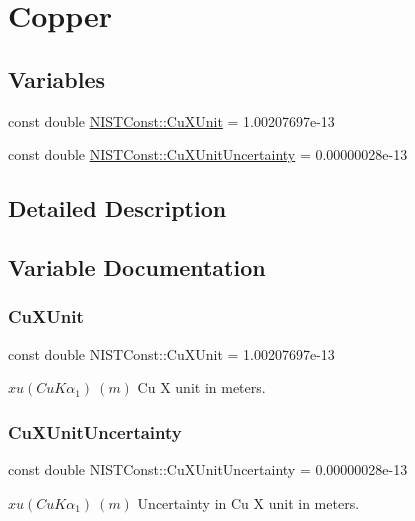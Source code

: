 \hypertarget{group___copper}{}\section{Copper}
\label{group___copper}
\subsection*{Variables}
\begin{DoxyCompactItemize}
\item 
const double \hyperlink{group___copper_gaefed00ac64123e598d5c20abac22f22f}{N\+I\+S\+T\+Const\+::\+Cu\+X\+Unit} = 1.\+00207697e-\/13
\item 
const double \hyperlink{group___copper_ga288d0a3002970fa7dc68df68e182f508}{N\+I\+S\+T\+Const\+::\+Cu\+X\+Unit\+Uncertainty} = 0.\+00000028e-\/13
\end{DoxyCompactItemize}


\subsection{Detailed Description}


\subsection{Variable Documentation}
\mbox{\label{group___copper_gaefed00ac64123e598d5c20abac22f22f}} 
\subsubsection{\texorpdfstring{Cu\+X\+Unit}{CuXUnit}}
{\footnotesize\ttfamily const double N\+I\+S\+T\+Const\+::\+Cu\+X\+Unit = 1.\+00207697e-\/13}

$xu(CuK\alpha_1) \ (m)$ Cu X unit in meters. \mbox{\label{group___copper_ga288d0a3002970fa7dc68df68e182f508}} 
\subsubsection{\texorpdfstring{Cu\+X\+Unit\+Uncertainty}{CuXUnitUncertainty}}
{\footnotesize\ttfamily const double N\+I\+S\+T\+Const\+::\+Cu\+X\+Unit\+Uncertainty = 0.\+00000028e-\/13}

$xu(CuK\alpha_1) \ (m)$ Uncertainty in Cu X unit in meters. 